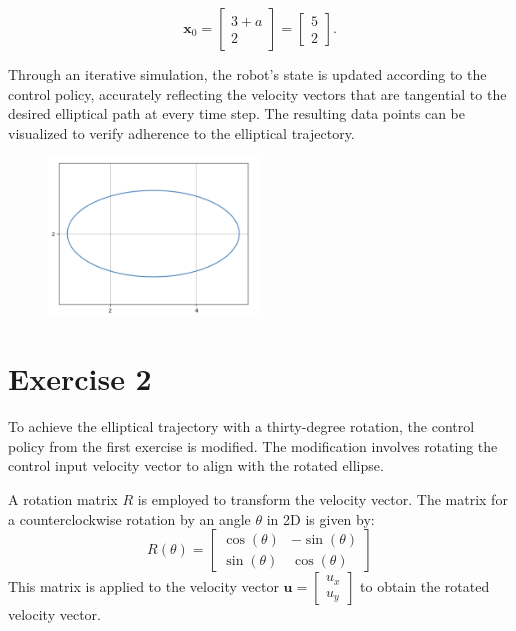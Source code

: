 \documentclass[letterpaper, 10 pt, conference]{ieeeconf}  %
\begin{document}
\begin{equation}
    \mathbf{x}_0 = \begin{bmatrix}
        3 + a \\
        2
    \end{bmatrix} = \begin{bmatrix}
        5 \\
        2
    \end{bmatrix}.
\end{equation}

Through an iterative simulation, the robot's state is updated according to the control policy, accurately reflecting the velocity vectors that are tangential to the desired elliptical path at every time step. The resulting data points can be visualized to verify adherence to the elliptical trajectory.

\begin{figure}[htbp]
    \centering
    \includegraphics[width=0.5\textwidth]{image1.png}
\end{figure}

\section{Exercise 2}

To achieve the elliptical trajectory with a thirty-degree rotation, the control policy from the first exercise is modified. The modification involves rotating the control input velocity vector to align with the rotated ellipse.

A rotation matrix \( R \) is employed to transform the velocity vector. The matrix for a counterclockwise rotation by an angle \( \theta \) in 2D is given by:
\begin{equation}
    R(\theta) = \begin{bmatrix}
        \cos(\theta) & -\sin(\theta) \\
        \sin(\theta) & \cos(\theta)
    \end{bmatrix}
\end{equation}
This matrix is applied to the velocity vector \( \mathbf{u} = \begin{bmatrix} u_x \\ u_y \end{bmatrix} \) to obtain the rotated velocity vector.
\end{document}
